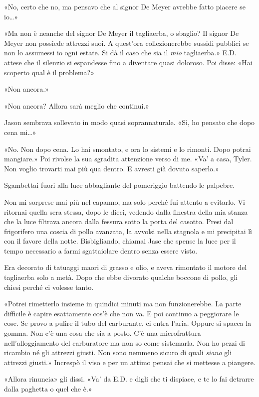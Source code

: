 «No, certo che no, ma pensavo che al signor De Meyer avrebbe fatto
piacere se io\ldots»

«Ma non è neanche del signor De Meyer il tagliaerba, o sbaglio? Il
signor De Meyer non possiede attrezzi suoi. A quest'ora collezionerebbe
sussidi pubblici se non lo assumessi io ogni estate. Si dà il caso che
sia il \emph{mio} tagliaerba.» E.D. attese che il silenzio si espandesse
fino a diventare quasi doloroso. Poi disse: «Hai scoperto qual è il
problema?»

«Non ancora.»

«Non ancora? Allora sarà meglio che continui.»

Jason sembrava sollevato in modo quasi soprannaturale. «Sì, ho pensato
che dopo cena mi\ldots»

«No. Non dopo cena. Lo hai smontato, e ora lo sistemi e lo rimonti. Dopo
potrai mangiare.» Poi rivolse la sua sgradita attenzione verso di me.
«Va' a casa, Tyler. Non voglio trovarti mai più qua dentro. E avresti
già dovuto saperlo.»

Sgambettai fuori alla luce abbagliante del pomeriggio battendo le
palpebre.

Non mi sorprese mai più nel capanno, ma solo perché fui attento a
evitarlo. Vi ritornai quella sera stessa, dopo le dieci, vedendo dalla
finestra della mia stanza che la luce filtrava ancora dalla fessura
sotto la porta del casotto. Presi dal frigorifero una coscia di pollo
avanzata, la avvolsi nella stagnola e mi precipitai lì con il favore
della notte. Bisbigliando, chiamai Jase che spense la luce per il tempo
necessario a farmi sgattaiolare dentro senza essere visto.

Era decorato di tatuaggi maori di grasso e olio, e aveva rimontato il
motore del tagliaerba solo a metà. Dopo che ebbe divorato qualche
boccone di pollo, gli chiesi perché ci volesse tanto.

«Potrei rimetterlo insieme in quindici minuti ma non funzionerebbe. La
parte difficile è capire esattamente cos'è che non va. E poi continuo a
peggiorare le cose. Se provo a pulire il tubo del carburante, ci entra
l'aria. Oppure si spacca la gomma. Non c'è una cosa che sia a posto. C'è
una microfrattura nell'alloggiamento del carburatore ma non so come
sistemarla. Non ho pezzi di ricambio né gli attrezzi giusti. Non sono
nemmeno sicuro di quali \emph{siano} gli attrezzi giusti.» Increspò il
viso e per un attimo pensai che si mettesse a piangere.

«Allora rinuncia» gli dissi. «Va' da E.D. e digli che ti dispiace, e te
lo fai detrarre dalla paghetta o quel che è.»

